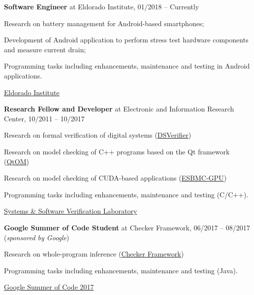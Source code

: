 \documentclass[letterpaper]{article}
\renewenvironment{itemize}{
  \begin{list}{}{
    \setlength{\leftmargin}{1.5em}
  }
}{
  \end{list}
}
\begin{document}
    \begin{enumerate}
         \item{{\bf Software Engineer} at Eldorado Institute, 01/2018 -- Currently}
      \begin{itemize}
        \item{\textendash} {Research on battery management for Android-based smartphones;}
        \item{\textendash} {Development of Android application to perform stress test hardware components and measure current drain;}
        \item{\textendash} {Programming tasks including enhancements, maintenance and testing in Android applications.}
        \item{\textendash} \href{http://eldorado.org.br/}{Eldorado Institute}
      \end{itemize}
     \item{{\bf Research Fellow and Developer} at Electronic and Information Research Center, 10/2011 -- 10/2017}
      \begin{itemize}
        \item{\textendash} {Research on formal verification of digital systems (\href{http://www.dsverifier.org/}{DSVerifier})}
        \item{\textendash} {Research on model checking of C++ programs based on the Qt framework (\href{http://www.esbmc/qtom/}{QtOM})}
        \item{\textendash} {Research on model checking of CUDA-based applications (\href{http://www.esbmc/gpu/}{ESBMC-GPU})}
        \item{\textendash} {Programming tasks including enhancements, maintenance and testing (C/C++).}
        \item{\textendash} \href{https://ssvlab.github.io}{Systems \& Software Verification Laboratory}
      \end{itemize}
      \item{{\bf Google Summer of Code Student} at Checker Framework, 06/2017 -- 08/2017 ({\it sponsored by Google})} 
      \begin{itemize}
        \item{\textendash} {Research on whole-program inference (\href{https://checkerframework.org/}{Checker Framework})}
        \item{\textendash} {Programming tasks including enhancements, maintenance and testing (Java).}
        \item{\textendash} \href{https://summerofcode.withgoogle.com/archive/2017/projects/6689181245898752/}{Google Summer of Code 2017}

\end{itemize}
\end{enumerate}
\end{document}

